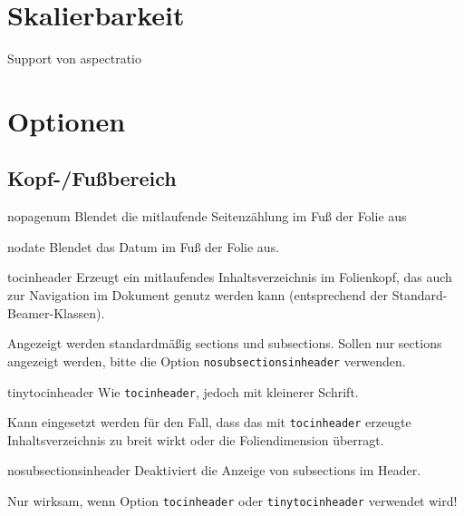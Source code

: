 \documentclass[a4paper,colorscheme=green,TUBStitlepage=picture]{tubsreprt}
\begin{document}
\section{Skalierbarkeit}

Support von aspectratio


\section{Optionen}


\subsection{Kopf-/Fußbereich}

\begin{classoption}{nopagenum}
  Blendet die mitlaufende Seitenzählung im Fuß der Folie aus
\end{classoption}

\begin{classoption}{nodate}
  Blendet das Datum im Fuß der Folie aus.
\end{classoption}

\begin{classoption}{tocinheader}
  Erzeugt ein mitlaufendes Inhaltsverzeichnis im Folienkopf,
  das auch zur Navigation im Dokument genutz werden kann
  (entsprechend der Standard-Beamer-Klassen).
  
  Angezeigt werden standardmäßig sections und subsections.
  Sollen nur sections angezeigt werden, bitte die Option
  \lstinline{nosubsectionsinheader} verwenden.
  
\end{classoption}

\begin{classoption}{tinytocinheader}
  Wie \lstinline{tocinheader}, jedoch mit kleinerer Schrift.

  Kann eingesetzt werden für den Fall, dass das mit \lstinline{tocinheader}
  erzeugte Inhaltsverzeichnis zu breit wirkt oder die Foliendimension
  überragt.
\end{classoption}

\begin{classoption}{nosubsectionsinheader}
  Deaktiviert die Anzeige von subsections im Header.
  
  Nur wirksam, wenn Option \lstinline{tocinheader} oder
  \lstinline{tinytocinheader} verwendet wird!
\end{classoption}
\end{document}
